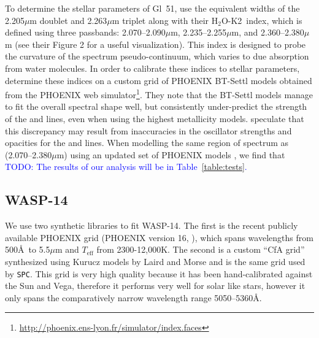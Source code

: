 \documentclass[iop,floatfix]{emulateapj}
\newcommand{\HK}{$\textrm{H}_2$O-K2}
\newcommand{\todo}[1]{ \textcolor{blue}{\\TODO: #1}}
\begin{document}
To determine the stellar parameters of Gl~51, \citep{rojas-ayala12} use the equivalent widths of the 2.205$\mu$m  doublet and 2.263$\mu$m  triplet along with their \HK\ index, which is defined using three passbands: 2.070--2.090$\mu$m, 2.235--2.255$\mu$m, and 2.360--2.380$\mu$m (see their Figure 2 for a useful visualization). This index is designed to probe the curvature of the spectrum pseudo-continuum, which varies to due absorption from water molecules. In order to calibrate these indices to stellar parameters, \citet{rojas-ayala12} determine these indices on a custom grid of PHOENIX BT-Settl models obtained from the PHOENIX web simulator\footnote{\url{http://phoenix.ens-lyon.fr/simulator/index.faces}}. They note that the BT-Settl models manage to fit the overall spectral shape well, but consistently under-predict the strength of the  and  lines, even when using the highest metallicity models. \citet{rajpurohit10} speculate that this discrepancy may result from inaccuracies in the oscillator strengths and opacities for the  and  lines. When modelling the same region of spectrum as \citet{rojas-ayala12} (2.070--2.380$\mu$m) using an updated set of PHOENIX models \citep{husser13}, we find that \todo{The results of our analysis will be in Table~\ref{table:tests}.} 

\subsection{WASP-14} \label{subsec:wasp}

We use two synthetic libraries to fit WASP-14. The first is the recent publicly available PHOENIX grid (PHOENIX version 16, \citealt{husser13}), which spans wavelengths from 500\AA\ to 5.5$\mu$m and $T_\textrm{eff}$ from 2300-12,000K. The second is a custom ``CfA grid'' synthesized using Kurucz models by Laird and Morse and is the same grid used by {\tt SPC}. This grid is very high quality because it has been hand-calibrated against the Sun and Vega, therefore it performs very well for solar like stars, however it only spans the comparatively narrow wavelength range 5050--5360\AA. 
\end{document}
